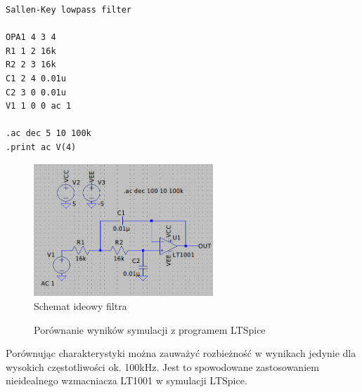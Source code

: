 \documentclass[11pt, final]{article}
\begin{document}
\begin{multicols}{2}
\begin{lstlisting}[caption=Netlista opisująca filtr]
Sallen-Key lowpass filter
 
OPA1 4 3 4
R1 1 2 16k
R2 2 3 16k
C1 2 4 0.01u
C2 3 0 0.01u
V1 1 0 0 ac 1
 
.ac dec 5 10 100k
.print ac V(4)
\end{lstlisting}

\columnbreak

\begin{figure}[H]
\centering
\includegraphics[height = 5cm]{sallen-ltspice-circ}
\caption{Schemat ideowy filtra}
\end{figure}
\end{multicols}


\begin{figure}[H]
\centering
{}
\hfill
\centering
{}
\caption{Porównanie wyników symulacji z programem LTSpice}
\end{figure}

Porównując charakterystyki można zauważyć rozbieżność w wynikach jedynie dla wysokich częstotliwości ok. 100kHz. Jest to spowodowane
zastosowaniem nieidealnego wzmacniacza LT1001 w symulacji LTSpice.
\end{document}
